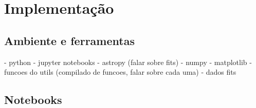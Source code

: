 \chapter{Implementação}
\label{cap:implementacao}

\section{Ambiente e ferramentas}
- python
- jupyter notebooks
- astropy (falar sobre fits)
- numpy
- matplotlib
- funcoes do utils (compilado de funcoes, falar sobre cada uma)
- dados fits

\section{Notebooks}


